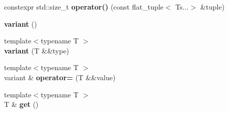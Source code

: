 \begin{CompactItemize}
\item 
\hypertarget{classhope_1_1final_2f01a7839847713939813c9f6d5ff315}{
constexpr std::size\_\-t \textbf{operator()} (const flat\_\-tuple$<$ Ts...$>$ \&tuple)}
\label{classhope_1_1final_2f01a7839847713939813c9f6d5ff315}

\item 
\hypertarget{classhope_1_1final_6634fff470139a5e8afde02afa1bd9ef}{
\textbf{variant} ()}
\label{classhope_1_1final_6634fff470139a5e8afde02afa1bd9ef}

\item 
\hypertarget{classhope_1_1final_3aac7a012a2890ce74ff8bcfdda253fb}{
{\footnotesize template$<$typename T $>$ }\\\textbf{variant} (T \&\&type)}
\label{classhope_1_1final_3aac7a012a2890ce74ff8bcfdda253fb}

\item 
\hypertarget{classhope_1_1final_97372acb21ea0b5e13f92266a6a02e2c}{
{\footnotesize template$<$typename T $>$ }\\variant \& \textbf{operator=} (T \&\&value)}
\label{classhope_1_1final_97372acb21ea0b5e13f92266a6a02e2c}

\item 
\hypertarget{classhope_1_1final_1c7929ca77ce3a3edc9c554fe9080463}{
{\footnotesize template$<$typename T $>$ }\\T \& \textbf{get} ()}
\label{classhope_1_1final_1c7929ca77ce3a3edc9c554fe9080463}

\end{CompactItemize}
